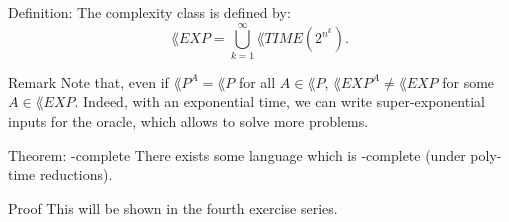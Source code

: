 \documentclass[a4paper]{article}
\begin{document}
\begin{parag}{Definition: }
    The  complexity class is defined by: 
    \[\lang{EXP} = \bigcup_{k=1}^{\infty} \lang{TIME}\left(2^{n^k}\right).\]

    \begin{subparag}{Remark}
        Note that, even if $\lang{P}^{A} = \lang{P}$ for all $A \in \lang{P}$, $\lang{EXP}^{A} \neq \lang{EXP}$ for some $A \in \lang{EXP}$. Indeed, with an exponential time, we can write super-exponential inputs for the oracle, which allows to solve more problems.
    \end{subparag}
\end{parag}
    
\begin{parag}{Theorem: -complete}
    There exists some language which is -complete (under poly-time reductions).

    \begin{subparag}{Proof}
        This will be shown in the fourth exercise series.
    \end{subparag}
\end{parag}
\end{document}
